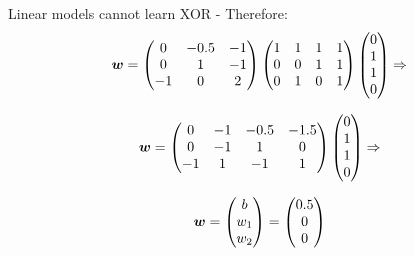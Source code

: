 \begin{frame}[t,allowframebreaks]{Linear models cannot learn XOR -}
    Therefore:
    \begin{equation*}
        \boldsymbol{w} = 
        \begin{pmatrix}
            0 & -0.5 & -1 \\
            0 &  1   & -1 \\
           -1 &  0   &  2 \\
        \end{pmatrix} 
        \begin{pmatrix}
            1 & 1 & 1 & 1 \\
            0 & 0 & 1 & 1 \\
            0 & 1 & 0 & 1 \\
        \end{pmatrix} 
        \begin{pmatrix}
            0 \\
            1 \\
            1 \\
            0 \\
        \end{pmatrix} \Rightarrow 
    \end{equation*}        

    \framebreak

    \begin{equation*}
        \boldsymbol{w} = 
        \begin{pmatrix}
            0 &  -1 &  -0.5 &  -1.5 \\
            0 &  -1 &   1   &   0   \\
           -1 &   1 &  -1   &   1   \\
        \end{pmatrix} 
        \begin{pmatrix}
            0 \\
            1 \\
            1 \\
            0 \\
        \end{pmatrix} \Rightarrow 
    \end{equation*}        

    \begin{equation}
        \boldsymbol{w} = 
        \begin{pmatrix}
            b   \\
            w_1 \\
            w_2 \\
        \end{pmatrix} =
        \begin{pmatrix}
            0.5 \\
            0 \\
            0 \\
        \end{pmatrix} 
    \end{equation}        

\end{frame}
